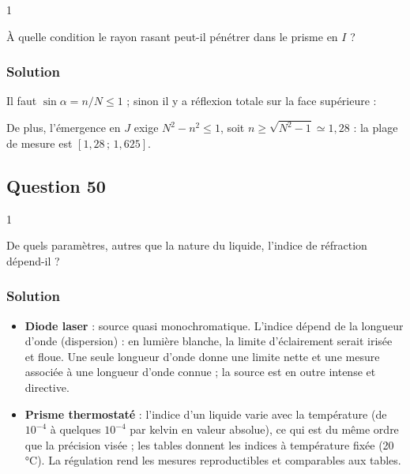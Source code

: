 \documentclass[11pt,a4paper]{article}
\providecommand{\tightlist}{\setlength{\itemsep}{0pt}\setlength{\parskip}{0pt}}
\newcommand{\equationajustee}[1]{%
  \sbox{\boiteequation}{$\displaystyle #1$}%
  \ifdim\wd\boiteequation>\linewidth
    \[\resizebox{\linewidth}{!}{\usebox{\boiteequation}}\]%
  \else
    \[#1\]%
  \fi}
\begin{document}
\begin{indication}{1}

À quelle condition le rayon rasant peut-il pénétrer dans le prisme en \(I\) ?

\end{indication}

\hypertarget{solution-48}{%
\subsubsection{Solution}\label{solution-48}}

Il faut \(\sin\alpha=n/N\le1\) ; sinon il y a réflexion totale sur la face supérieure :

\equationajustee{\boxed{n_{\max}=N=1{,}625}}

De plus, l'émergence en \(J\) exige \(N^2-n^2\le1\), soit \(n\ge\sqrt{N^2-1}\simeq1{,}28\) : la plage de mesure est \([1{,}28\,;\,1{,}625]\).

\hypertarget{question-50}{%
\subsection{Question 50}\label{question-50}}

\begin{indication}{1}

De quels paramètres, autres que la nature du liquide, l'indice de réfraction dépend-il ?

\end{indication}

\hypertarget{solution-49}{%
\subsubsection{Solution}\label{solution-49}}

\begin{itemize}
\tightlist
\item
  \textbf{Diode laser} : source quasi monochromatique. L'indice dépend de la longueur d'onde (dispersion) : en lumière blanche, la limite d'éclairement serait irisée et floue. Une seule longueur d'onde donne une limite nette et une mesure associée à une longueur d'onde connue ; la source est en outre intense et directive.
\item
  \textbf{Prisme thermostaté} : l'indice d'un liquide varie avec la température (de \(10^{-4}\) à quelques \(10^{-4}\) par kelvin en valeur absolue), ce qui est du même ordre que la précision visée ; les tables donnent les indices à température fixée (20 °C). La régulation rend les mesures reproductibles et comparables aux tables.
\end{itemize}
\end{document}
